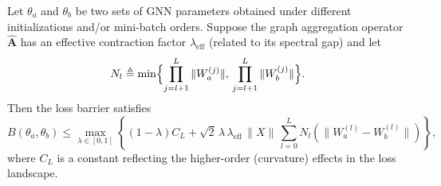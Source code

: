 \begin{theorem}
\label{thm:loss-barrier-bound}
Let \(\theta_a\) and \(\theta_b\) be two sets of GNN parameters obtained under different initializations and/or mini-batch orders. Suppose the graph aggregation operator \(\hat{\mathbf{A}}\) has an effective contraction factor \(\lambda_{\mathrm{eff}}\) (related to its spectral gap) and let
\[
N_l \triangleq \min\Bigl\{ \prod_{j=l+1}^{L} \|W_a^{(j)}\|,\,\prod_{j=l+1}^{L} \|W_b^{(j)}\| \Bigr\}.
\]
Then the loss barrier satisfies
\begin{equation}
\label{eq:final-bound}
B(\theta_a,\theta_b) \le \max_{\lambda \in [0,1]} \left\{ (1-\lambda) C_L + \sqrt{2}\,\lambda\,\lambda_{\mathrm{eff}}\,\|X\|\,\sum_{l=0}^{L} N_l \left( \|W_a^{(l)}-W_b^{(l)}\|  \right) \right\},
\end{equation}
where \(C_L\) is a constant reflecting the higher-order (curvature) effects in the loss landscape.
\end{theorem}
